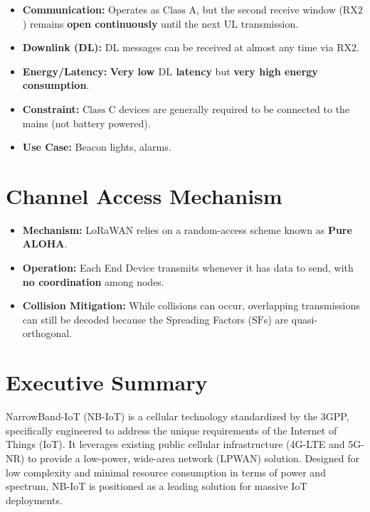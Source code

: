 \documentclass[a4paper, 12pt]{book} %
\begin{document}
\begin{itemize}
\tightlist
\item
  \textbf{Communication:} Operates as \(\text{Class A}\), but the second
  receive window (\(\text{RX}2\)) remains \textbf{open continuously}
  until the next \(\text{UL}\) transmission.
\item
  \textbf{Downlink (DL):} \(\text{DL}\) messages can be received at
  almost any time via \(\text{RX}2\).
\item
  \textbf{Energy/Latency:} \textbf{Very low \(\text{DL}\) latency} but
  \textbf{very high energy consumption}.
\item
  \textbf{Constraint:} \(\text{Class C}\) devices are generally required
  to be connected to the mains (not battery powered).
\item
  \textbf{Use Case:} Beacon lights, alarms.
\end{itemize}

\section{Channel Access Mechanism}\label{channel-access-mechanism}

\begin{itemize}
\tightlist
\item
  \textbf{Mechanism:} LoRaWAN relies on a random-access scheme known as
  \textbf{Pure ALOHA}.
\item
  \textbf{Operation:} Each End Device transmits whenever it has data to
  send, with \textbf{no coordination} among nodes.
\item
  \textbf{Collision Mitigation:} While collisions can occur, overlapping
  transmissions can still be decoded because the Spreading Factors
  (\(\text{SF}\)s) are quasi-orthogonal.
\end{itemize}


\section{Executive Summary}\label{executive-summary}

NarrowBand-IoT (NB-IoT) is a cellular technology standardized by the
3GPP, specifically engineered to address the unique requirements of the
Internet of Things (IoT). It leverages existing public cellular
infrastructure (4G-LTE and 5G-NR) to provide a low-power, wide-area
network (LPWAN) solution. Designed for low complexity and minimal
resource consumption in terms of power and spectrum, NB-IoT is
positioned as a leading solution for massive IoT deployments.
\end{document}
